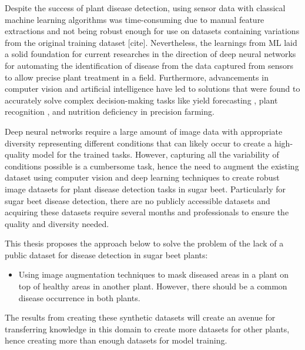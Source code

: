 Despite the success of plant disease detection, using sensor data with classical machine learning algorithms was time-consuming due to manual feature extractions and not being robust enough for use on datasets containing variations from the original training dataset [cite]. Nevertheless, the learnings from ML laid a solid foundation for current researches in the direction of deep neural networks for automating the identification of disease from the data captured from sensors to allow precise plant treatment in a field. Furthermore, advancements in computer vision and artificial intelligence have led to solutions that were found to accurately solve complex decision-making tasks like yield forecasting \cite{liu2017computer}, plant recognition \cite{gao2017mobile}, and nutrition deficiency \cite{yi2020deep} in precision farming.

Deep neural networks require a large amount of image data with appropriate diversity representing different conditions that can likely occur to create a high-quality model for the trained tasks. However, capturing all the variability of conditions possible is a cumbersome task, hence the need to augment the existing dataset using computer vision and deep learning techniques to create robust image datasets for plant disease detection tasks in sugar beet. Particularly for sugar beet disease detection, there are no publicly accessible datasets and acquiring these datasets require several months and professionals to ensure the quality and diversity needed.

This thesis proposes the approach below to solve the problem of the lack of a public dataset for disease detection in sugar beet plants:
 \begin{itemize}
     \item Using image augmentation techniques to mask diseased areas in a plant on top of healthy areas in another plant. However, there should be a common disease occurrence in both plants.

 \end{itemize}


The results from creating these synthetic datasets will create an avenue for transferring knowledge in this domain to create more datasets for other plants, hence creating more than enough datasets for model training.

